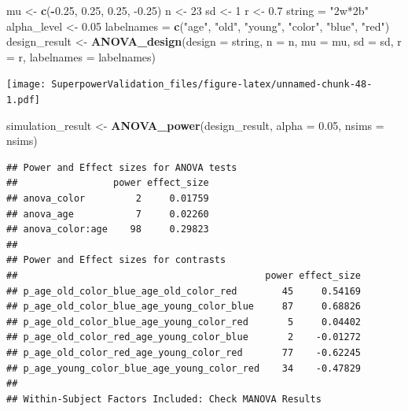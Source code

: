 \documentclass[]{book}
\newenvironment{Shaded}{\begin{snugshade}}{\end{snugshade}}
\newcommand{\DataTypeTok}[1]{\textcolor[rgb]{0.13,0.29,0.53}{#1}}
\newcommand{\DecValTok}[1]{\textcolor[rgb]{0.00,0.00,0.81}{#1}}
\newcommand{\FloatTok}[1]{\textcolor[rgb]{0.00,0.00,0.81}{#1}}
\newcommand{\KeywordTok}[1]{\textcolor[rgb]{0.13,0.29,0.53}{\textbf{#1}}}
\newcommand{\NormalTok}[1]{#1}
\newcommand{\OperatorTok}[1]{\textcolor[rgb]{0.81,0.36,0.00}{\textbf{#1}}}
\newcommand{\StringTok}[1]{\textcolor[rgb]{0.31,0.60,0.02}{#1}}
\begin{document}
\begin{Shaded}
\begin{Highlighting}[]
\NormalTok{mu <-}\StringTok{ }\KeywordTok{c}\NormalTok{(}\OperatorTok{-}\FloatTok{0.25}\NormalTok{, }\FloatTok{0.25}\NormalTok{, }\FloatTok{0.25}\NormalTok{, }\FloatTok{-0.25}\NormalTok{)}
\NormalTok{n <-}\StringTok{ }\DecValTok{23}
\NormalTok{sd <-}\StringTok{ }\DecValTok{1}
\NormalTok{r <-}\StringTok{ }\FloatTok{0.7}
\NormalTok{string =}\StringTok{ "2w*2b"}
\NormalTok{alpha_level <-}\StringTok{ }\FloatTok{0.05}
\NormalTok{labelnames =}\StringTok{ }\KeywordTok{c}\NormalTok{(}\StringTok{"age"}\NormalTok{, }\StringTok{"old"}\NormalTok{, }\StringTok{"young"}\NormalTok{, }\StringTok{"color"}\NormalTok{, }\StringTok{"blue"}\NormalTok{, }\StringTok{"red"}\NormalTok{)}
\NormalTok{design_result <-}\StringTok{ }\KeywordTok{ANOVA_design}\NormalTok{(}\DataTypeTok{design =}\NormalTok{ string,}
                              \DataTypeTok{n =}\NormalTok{ n, }
                              \DataTypeTok{mu =}\NormalTok{ mu, }
                              \DataTypeTok{sd =}\NormalTok{ sd, }
                              \DataTypeTok{r =}\NormalTok{ r, }
                              \DataTypeTok{labelnames =}\NormalTok{ labelnames)}
\end{Highlighting}
\end{Shaded}

\texttt{[image: SuperpowerValidation\_files/figure-latex/unnamed-chunk-48-1.pdf]}

\begin{Shaded}
\begin{Highlighting}[]
\NormalTok{simulation_result <-}\StringTok{ }\KeywordTok{ANOVA_power}\NormalTok{(design_result, }\DataTypeTok{alpha =} \FloatTok{0.05}\NormalTok{, }\DataTypeTok{nsims =}\NormalTok{ nsims)}
\end{Highlighting}
\end{Shaded}

\begin{verbatim}
## Power and Effect sizes for ANOVA tests
##                 power effect_size
## anova_color         2     0.01759
## anova_age           7     0.02260
## anova_color:age    98     0.29823
## 
## Power and Effect sizes for contrasts
##                                            power effect_size
## p_age_old_color_blue_age_old_color_red        45     0.54169
## p_age_old_color_blue_age_young_color_blue     87     0.68826
## p_age_old_color_blue_age_young_color_red       5     0.04402
## p_age_old_color_red_age_young_color_blue       2    -0.01272
## p_age_old_color_red_age_young_color_red       77    -0.62245
## p_age_young_color_blue_age_young_color_red    34    -0.47829
## 
## Within-Subject Factors Included: Check MANOVA Results
\end{verbatim}
\end{document}
